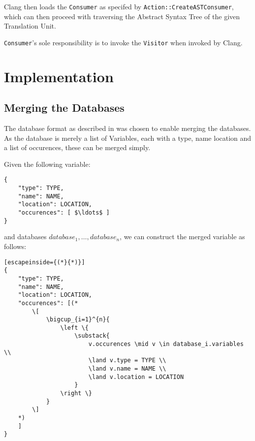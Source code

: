 Clang then loads the \lstinline|Consumer| as specifed by
\lstinline|Action::CreateASTConsumer|, which can then proceed with traversing
the Abstract Syntax Tree of the given Translation Unit.

\lstinline|Consumer|'s sole responsibility is to invoke the \lstinline|Visitor|
when invoked by Clang.

\section{Implementation}
\subsection{Merging the Databases}

The database format as described in  was chosen to enable
merging the databases.
As the database is merely a list of Variables, each with a type, name location
and a list of occurences, these can be merged simply.

Given the following variable:
\begin{lstlisting}[mathescape]
{
	"type": TYPE,
	"name": NAME,
	"location": LOCATION,
	"occurences": [ $\ldots$ ]
}
\end{lstlisting}
and databases $database_1, \ldots, database_n$, we can construct the merged
variable as follows:

\begin{lstlisting}[escapeinside={(*}{*)}]
{
	"type": TYPE,
	"name": NAME,
	"location": LOCATION,
	"occurences": [(*
		\[
			\bigcup_{i=1}^{n}{
				\left \{
					\substack{
						v.occurences \mid v \in database_i.variables \\
						\land v.type = TYPE \\
						\land v.name = NAME \\
						\land v.location = LOCATION
					}
				\right \}
			}
		\]
	*)
	]
}
\end{lstlisting}
